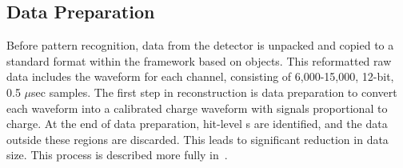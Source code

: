 \subsection{Data Preparation}

Before pattern recognition, data from the  detector is
unpacked and copied to a standard format within the  framework based on  objects. 
This reformatted raw data includes the waveform for each channel, consisting of 6,000-15,000,  12-bit, 0.5 $\mu$sec samples. 
The first step in reconstruction is data preparation to
convert each  waveform into a calibrated charge waveform with
signals proportional to charge. At the end of data preparation, hit-level s are identified, and the data outside these regions are discarded.  This leads to significant reduction in data size. This process is described more fully in~\cite{bib:docdb12349}. %

